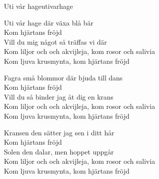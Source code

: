 \begin{song}{Uti vår hage}{utivarhage}
\begin{vers}
Uti vår hage där växa blå bär\\
Kom hjärtans fröjd\\
Vill du mig något så träffas vi där\\
Kom liljor och och akvijleja, kom rosor och salivia\\
Kom ljuva krusmynta, kom hjärtans fröjd\\
\end{vers}
\begin{vers}
Fagra små blommor där bjuda till dans\\
Kom hjärtans fröjd\\
Vill du så binder jag åt dig en krans\\
Kom liljor och och akvijleja, kom rosor och salivia\\
Kom ljuva krusmynta, kom hjärtans fröjd\\
\end{vers}
\begin{vers}
Kransen den sätter jag sen i ditt hår\\
Kom hjärtans fröjd\\
Solen den dalar, men hoppet uppgår\\
Kom liljor och och akvijleja, kom rosor och salivia\\
Kom ljuva krusmynta, kom hjärtans fröjd\\
\end{vers}
\end{song}
